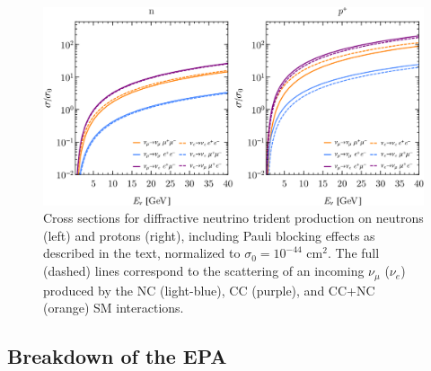 \begin{figure}[t]
\centering\includegraphics[width=\textwidth]{figs/Xsec_4PS_diff.pdf}
\caption{Cross sections for diffractive neutrino trident production on neutrons (left) and protons (right), including Pauli blocking effects as described in the text, normalized to $\sigma_0 =  10^{-44}$ cm$^2$. The full (dashed) lines correspond to the scattering of an incoming $\nu_\mu$ ($\nu_e$) produced by the NC (light-blue), CC (purple), and CC+NC (orange) SM interactions. \label{fig:dif_xsec}}
\end{figure}


\subsection{Breakdown of the EPA \label{sec:EPAbreakdown}}

